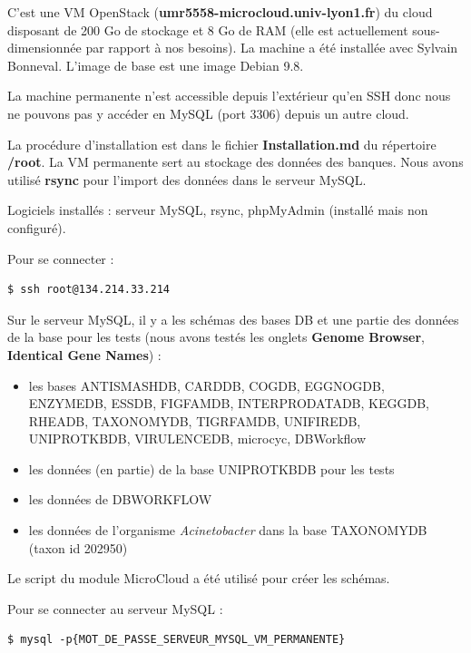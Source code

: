 C'est une VM OpenStack (\textbf{umr5558-microcloud.univ-lyon1.fr}) du cloud  disposant de 200 Go de stockage et 8 Go de RAM (elle est actuellement sous-dimensionnée par rapport à nos besoins). La machine a été installée avec Sylvain Bonneval. L'image de base est une image Debian 9.8.

La machine permanente n'est accessible depuis l'extérieur qu'en SSH donc nous ne pouvons pas y accéder en MySQL (port 3306) depuis un autre cloud.
\newline

La procédure d'installation est dans le fichier \textbf{Installation.md} du répertoire \textbf{/root}. La VM permanente sert au stockage des données des banques. Nous avons utilisé \textbf{rsync} pour l'import des données dans le serveur MySQL.
\newline

Logiciels installés : serveur MySQL, rsync, phpMyAdmin (installé mais non configuré). 
\newline

Pour se connecter : 
\begin{lstlisting}[style=bash]
$ ssh root@134.214.33.214
\end{lstlisting}
\bigskip

Sur le serveur MySQL, il y a les schémas des bases DB et une partie des données de la base pour les tests (nous avons testés les onglets \textbf{Genome Browser}, \textbf{Identical Gene Names}) :
\begin{itemize}
    \item les bases ANTISMASHDB, CARDDB, COGDB, EGGNOGDB, ENZYMEDB, ESSDB, FIGFAMDB, INTERPRODATADB, KEGGDB, RHEADB, TAXONOMYDB, TIGRFAMDB, UNIFIREDB, UNIPROTKBDB, VIRULENCEDB, microcyc, DBWorkflow
    \item les données (en partie) de la base UNIPROTKBDB pour les tests
    \item les données de DBWORKFLOW
    \item les données de l'organisme \textit{Acinetobacter} dans la base TAXONOMYDB (taxon id 202950)
\end{itemize}

Le script  du module MicroCloud a été utilisé pour créer les schémas.
\newline

Pour se connecter au serveur MySQL :
\begin{lstlisting}[style=bash]
$ mysql -p{MOT_DE_PASSE_SERVEUR_MYSQL_VM_PERMANENTE}
\end{lstlisting}


